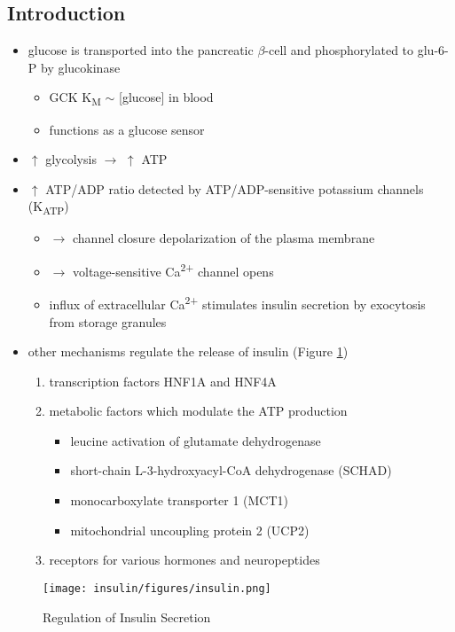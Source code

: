 \documentclass[12pt]{scrartcl}
\begin{document}
\subsection{Introduction}
\label{sec:orge86d67d}
\begin{itemize}
\item glucose is transported into the pancreatic \(\beta\)-cell and phosphorylated to glu-6-P by glucokinase
\begin{itemize}
\item GCK K\textsubscript{M} \(\sim\) [glucose] in blood
\item functions as a glucose sensor
\end{itemize}
\item \(\uparrow\) glycolysis \(\to\) \(\uparrow\) ATP
\item \(\uparrow\) ATP/ADP ratio detected by ATP/ADP-sensitive potassium channels (K\textsubscript{ATP})
\begin{itemize}
\item \(\to\) channel closure depolarization of the plasma membrane
\item \(\to\) voltage-sensitive Ca\textsuperscript{2+} channel opens
\item influx of extracellular Ca\textsuperscript{2+} stimulates insulin secretion by
exocytosis from storage granules
\end{itemize}

\item other mechanisms regulate the release of insulin (Figure \ref{fig:orgb2b6fe6})
\begin{enumerate}
\item transcription factors HNF1A and HNF4A
\item metabolic factors which modulate the ATP production
\begin{itemize}
\item leucine activation of glutamate dehydrogenase
\item short-chain L-3-hydroxyacyl-CoA dehydrogenase (SCHAD)
\item monocarboxylate transporter 1 (MCT1)
\item mitochondrial uncoupling protein 2 (UCP2)
\end{itemize}
\item receptors for various hormones and neuropeptides
\end{enumerate}
\end{itemize}



\begin{figure}[htbp]
\centering
\texttt{[image: insulin/figures/insulin.png]}
\caption[insulin]{\label{fig:orgb2b6fe6}Regulation of Insulin Secretion}
\end{figure}
\end{document}

